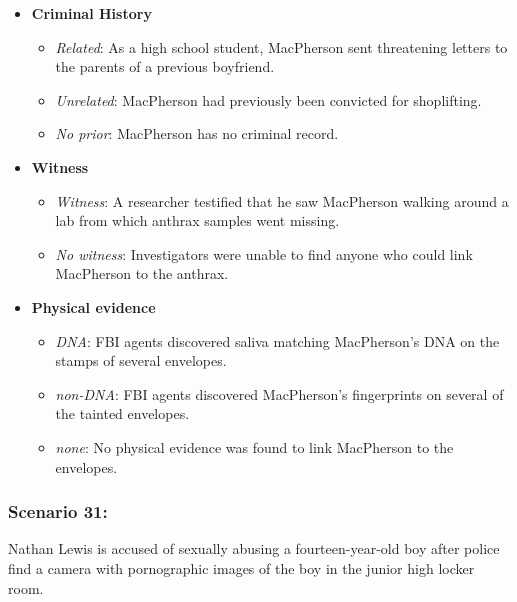 \documentclass[
]{article}
\providecommand{\tightlist}{%
  \setlength{\itemsep}{0pt}\setlength{\parskip}{0pt}}
\begin{document}
\begin{itemize}
\tightlist
\item
  \textbf{Criminal History}

  \begin{itemize}
  \tightlist
  \item
    \emph{Related}: As a high school student, MacPherson sent
    threatening letters to the parents of a previous boyfriend.
  \item
    \emph{Unrelated}: MacPherson had previously been convicted for
    shoplifting.
  \item
    \emph{No prior}: MacPherson has no criminal record.
  \end{itemize}
\item
  \textbf{Witness}

  \begin{itemize}
  \tightlist
  \item
    \emph{Witness}: A researcher testified that he saw MacPherson
    walking around a lab from which anthrax samples went missing.
  \item
    \emph{No witness}: Investigators were unable to find anyone who
    could link MacPherson to the anthrax.
  \end{itemize}
\item
  \textbf{Physical evidence}

  \begin{itemize}
  \tightlist
  \item
    \emph{DNA}: FBI agents discovered saliva matching MacPherson's DNA
    on the stamps of several envelopes.
  \item
    \emph{non-DNA}: FBI agents discovered MacPherson's fingerprints on
    several of the tainted envelopes.
  \item
    \emph{none}: No physical evidence was found to link MacPherson to
    the envelopes.
  \end{itemize}
\end{itemize}

\hypertarget{scenario-31}{%
\subsubsection{Scenario 31:}\label{scenario-31}}

Nathan Lewis is accused of sexually abusing a fourteen-year-old boy
after police find a camera with pornographic images of the boy in the
junior high locker room.
\end{document}
